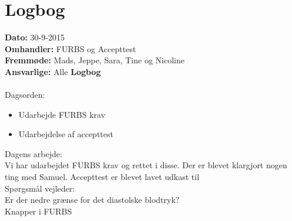 \section{Logbog}

\textbf{Dato:} 30-9-2015 \\
\textbf{Omhandler:} FURBS og Accepttest\\
\textbf{Fremmøde:} Mads, Jeppe, Sara, Tine og Nicoline\\
\textbf{Ansvarlige:} Alle
\textbf{Logbog}
\\
\\
Dagsorden:
\begin{itemize}
	\item Udarbejde FURBS krav
	\item Udarbejdelse af accepttest
\end{itemize}

Dagens arbejde: \\
Vi har udarbejdet FURBS krav og rettet i disse.  
Der er blevet klargjort nogen ting med Samuel.
Accepttest er blevet lavet udkast til\\


Spørgsmål vejleder: \\
Er der nedre grænse for det diastolske blodtryk?\\
Knapper i FURBS\\

